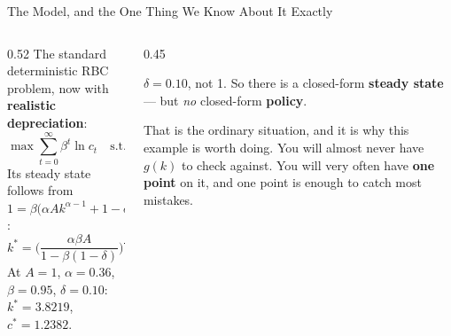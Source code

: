 \begin{frame}{The Model, and the One Thing We Know About It Exactly}
\begin{columns}[T]
\begin{column}{0.52\textwidth}
\small
The standard deterministic RBC problem, now with \textbf{realistic depreciation}:
\[
  \max \sum_{t=0}^{\infty}\beta^{t}\ln c_t
  \quad\text{s.t.}\quad c_t+k_{t+1}=Ak_t^{\alpha}+(1-\delta)k_t .
\]
Its steady state follows from $1=\beta\big(\alpha Ak^{\alpha-1}+1-\delta\big)$:
\[
  k^{*}=\Big(\frac{\alpha\beta A}{1-\beta(1-\delta)}\Big)^{\frac{1}{1-\alpha}} .
\]
At $A=1$, $\alpha=0.36$, $\beta=0.95$, $\delta=0.10$: \;$k^{*}=\mathbf{3.8219}$, $c^{*}=1.2382$.
\end{column}
\begin{column}{0.45\textwidth}
\begin{cautionbox}[title=\textbf{What changed from this morning}]\small
$\delta=0.10$, not 1. So there is a closed-form \textbf{steady state} --- but \emph{no} closed-form \textbf{policy}.
\end{cautionbox}
\medskip
\begin{takeawaybox}\footnotesize
That is the ordinary situation, and it is why this example is worth doing. You will almost never have $g(k)$ to check against. You will very often have \textbf{one point} on it, and one point is enough to catch most mistakes.
\end{takeawaybox}
\end{column}
\end{columns}
\vspace{1mm}
\end{frame}

